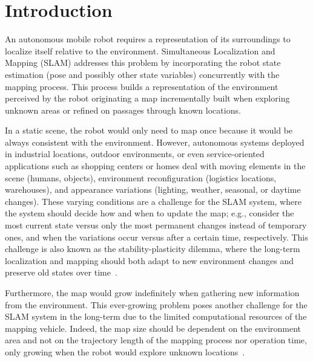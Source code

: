 \section{Introduction}
\label{sec:intro}

An autonomous mobile robot requires a representation of its surroundings to localize itself relative to the environment.
Simultaneous Localization and Mapping (SLAM) addresses this problem by incorporating the robot state estimation (pose and possibly other state variables) concurrently with the mapping process. This process builds a representation of the environment perceived by the robot originating a map incrementally built when exploring unknown areas or refined on passages through known locations.

In a static scene, the robot would only need to map once because it would be always consistent with the environment.
However, autonomous systems deployed in industrial locations, outdoor environments, or even service-oriented applications such as shopping centers or homes deal with moving elements in the scene (humans, objects), environment reconfiguration (logistics locations, warehouses), and appearance variations (lighting, weather, seasonal, or daytime changes).
These varying conditions are a challenge for the SLAM system, where the system should decide how and when to update the map; e.g., consider the most current state versus only the most permanent changes instead of temporary ones, and when the variations occur versus after a certain time, respectively.
This challenge is also known as the stability-plasticity dilemma, where the long-term localization and mapping should both adapt to new environment changes and preserve old states over time~\parencite{biber-duckett:2009:0278364908096286}.

Furthermore, the map would grow indefinitely when gathering new information from the environment. This ever-growing problem poses another challenge for the SLAM system in the long-term due to the limited computational resources of the mapping vehicle. Indeed, the map size should be dependent on the environment area and not on the trajectory length of the mapping process nor operation time, only growing when the robot would explore unknown locations~\parencite{kretzschmar-stachniss:2012:0278364912455072}.

